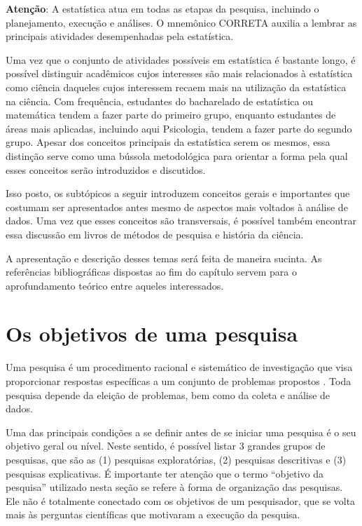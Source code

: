 \documentclass[
]{book}
\begin{document}
\textbf{Atenção}: A estatística atua em todas as etapas da pesquisa, incluindo o planejamento, execução e análises. O mnemônico CORRETA auxilia a lembrar as principais atividades desempenhadas pela estatística.

Uma vez que o conjunto de atividades possíveis em estatística é bastante longo, é possível distinguir acadêmicos cujos interesses são mais relacionados à estatística como ciência daqueles cujos interessem recaem mais na utilização da estatística na ciência. Com frequência, estudantes do bacharelado de estatística ou matemática tendem a fazer parte do primeiro grupo, enquanto estudantes de áreas mais aplicadas, incluindo aqui Psicologia, tendem a fazer parte do segundo grupo. Apesar dos conceitos principais da estatística serem os mesmos, essa distinção serve como uma bússola metodológica para orientar a forma pela qual esses conceitos serão introduzidos e discutidos.

Isso posto, os subtópicos a seguir introduzem conceitos gerais e importantes que costumam ser apresentados antes mesmo de aspectos mais voltados à análise de dados. Uma vez que esses conceitos são transversais, é possível também encontrar essa discussão em livros de métodos de pesquisa e história da ciência.

A apresentação e descrição desses temas será feita de maneira sucinta. As referências bibliográficas dispostas ao fim do capítulo servem para o aprofundamento teórico entre aqueles interessados.

\hypertarget{os-objetivos-de-uma-pesquisa}{%
\section{Os objetivos de uma pesquisa}\label{os-objetivos-de-uma-pesquisa}}

Uma pesquisa é um procedimento racional e sistemático de investigação que visa proporcionar respostas específicas a um conjunto de problemas propostos \citep{gil2002}. Toda pesquisa depende da eleição de problemas, bem como da coleta e análise de dados.

Uma das principais condições a se definir antes de se iniciar uma pesquisa é o seu objetivo geral ou nível. Neste sentido, é possível listar 3 grandes grupos de pesquisas, que são as (1) pesquisas exploratórias, (2) pesquisas descritivas e (3) pesquisas explicativas. É importante ter atenção que o termo ``objetivo da pesquisa'' utilizado nesta seção se refere à forma de organização das pesquisas. Ele não é totalmente conectado com os objetivos de um pesquisador, que se volta mais às perguntas científicas que motivaram a execução da pesquisa.
\end{document}
